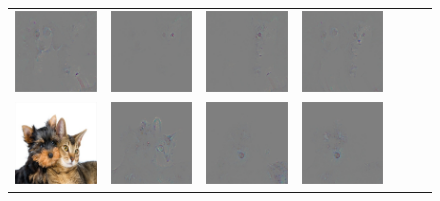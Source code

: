 \begin{figure}
\begin{center}
\begin{tabular}{ccccccc}
\includegraphics[width=0.14\linewidth,height=0.11\linewidth]{figs/class_compare/googlenet/soft/dog-cat2_diff_188} &
\includegraphics[width=0.14\linewidth,height=0.11\linewidth]{figs/class_compare/googlenet/soft/dog-cat2_diff_279} &
\includegraphics[width=0.14\linewidth,height=0.11\linewidth]{figs/class_compare/googlenet/soft/dog-cat2_diff_293} &
\includegraphics[width=0.14\linewidth,height=0.11\linewidth]{figs/class_compare/googlenet/soft/dog-cat2_diff_10} \\
\includegraphics[width=0.14\linewidth,height=0.11\linewidth]{figs/class_compare/googlenet/soft/dog-cat3} &
\includegraphics[width=0.14\linewidth,height=0.11\linewidth]{figs/class_compare/googlenet/soft/dog-cat3_diff_258} &
\includegraphics[width=0.14\linewidth,height=0.11\linewidth]{figs/class_compare/googlenet/soft/dog-cat3_diff_163} &
\includegraphics[width=0.14\linewidth,height=0.11\linewidth]{figs/class_compare/googlenet/soft/dog-cat3_diff_188} &

\end{tabular}
\end{center}
\end{figure}
